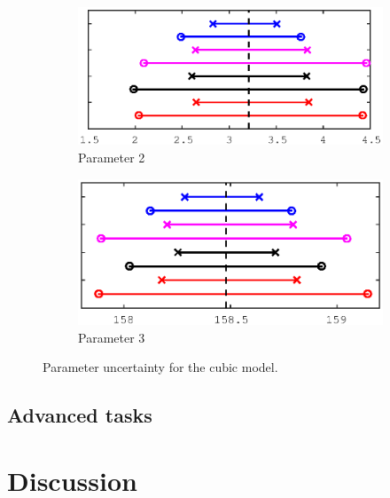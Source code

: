 \documentclass[11pt,a4paper,oneside]{report}
\begin{document}
\begin{figure}[H]
  \begin{subfigure}[b]{0.5\textwidth}
    \includegraphics[width=\textwidth, trim=0 0 0 0,clip=true]{figures/task5/uncert_model3_param3.eps}
    \caption{Parameter 2}
  \end{subfigure}%
  \begin{subfigure}[b]{0.5\textwidth}
    \includegraphics[width=\textwidth, trim=0 0 0 0,clip=true]{figures/task5/uncert_model3_param4.eps}
    \caption{Parameter 3}
  \end{subfigure}%
  
  \caption{Parameter uncertainty for the cubic model.}
  \label{fig:c5uncertM1}
  
\end{figure}

\subsection*{Advanced tasks}

\section*{Discussion}



\end{document}

